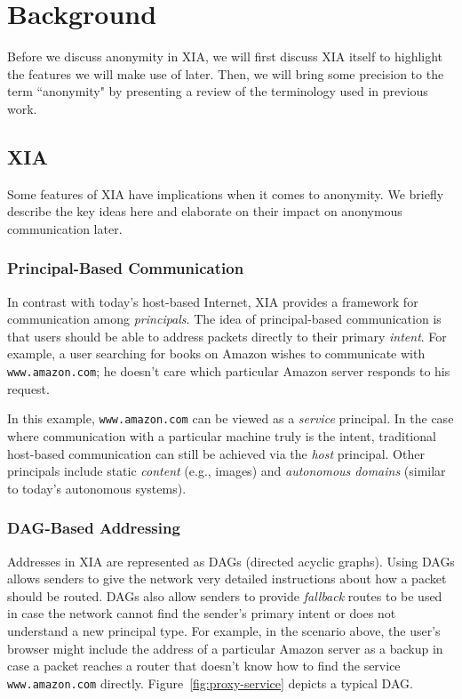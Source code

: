 \documentclass{article}
\begin{document}
\section{Background}
\label{background}
Before we discuss anonymity in XIA, we will first discuss XIA itself to highlight the features we will make use of later. Then, we will bring some precision to the term ``anonymity" by presenting a review of the terminology used in previous work.

\subsection{XIA}
Some features of XIA have implications when it comes to anonymity. We briefly describe the key ideas here and elaborate on their impact on anonymous communication later.
\subsubsection{Principal-Based Communication}
In contrast with today's host-based Internet, XIA provides a framework for communication among \emph{principals}. The idea of principal-based communication is that users should be able to address packets directly to their primary \emph{intent}. For example, a user searching for books on Amazon wishes to communicate with \texttt{www.amazon.com}; he doesn't care which particular Amazon server responds to his request.

In this example, \texttt{www.amazon.com} can be viewed as a \emph{service} principal. In the case where communication with a particular machine truly is the intent, traditional host-based communication can still be achieved via the \emph{host} principal. Other principals include static \emph{content} (e.g., images) and \emph{autonomous domains} (similar to today's autonomous systems).

\subsubsection{DAG-Based Addressing}
Addresses in XIA are represented as DAGs (directed acyclic graphs). Using DAGs allows senders to give the network very detailed instructions about how a packet should be routed. DAGs also allow senders to provide {\em fallback} routes to be used in case the network cannot find the sender's primary intent or does not understand a new principal type. For example, in the scenario above, the user's browser might include the address of a particular Amazon server as a backup in case a packet reaches a router that doesn't know how to find the service \texttt{www.amazon.com} directly. Figure~\ref{fig:proxy-service} depicts a typical DAG.
\end{document}
